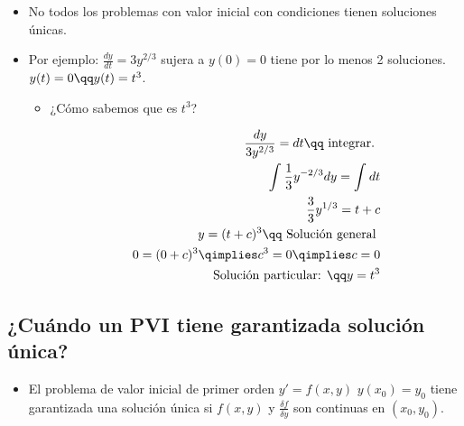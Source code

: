 \begin{itemize}
    \item No todos los problemas con valor inicial con condiciones tienen soluciones únicas.
    \item Por ejemplo: $\displaystyle \frac{d y}{d t} =3y^{2/3}$  sujera a $y(0)=0$ tiene por lo menos 2 soluciones. $y(t)=0 \qq y(t)=t^3$.
        \begin{itemize}
            \item ¿Cómo sabemos que es $t^3$?
                \begin{center}
                   \begin{align*}
                       \frac{dy}{3y^{2/3}}=dt \qq \text{ integrar. } \\ 
                        \int_{}^{}\frac{1}{3}y^{-2/3}dy = \int_{}^{}dt \\ 
                        \frac{3}{3}y^{1/3} = t + c \\ 
                        y = (t+c)^3 \qq \text{ Solución general } \\ 
                        0 = (0 + c)^3 \qimplies c^3=0 \qimplies c=0 \\ 
                        \text{ Solución particular: } \qq y = t^3 \\ 
                   \end{align*}
                \end{center}
        \end{itemize}
\end{itemize}

\subsection{¿Cuándo un PVI tiene garantizada solución única?}
\begin{itemize}
    \item El problema de valor inicial de primer orden $y'=f(x,y)$ $y(x_0)=y_0$ tiene garantizada una solución única si $f(x,y)$ y $\frac{\delta f}{\delta y} $ son continuas en $(x_0,y_0)$.
\end{itemize}

